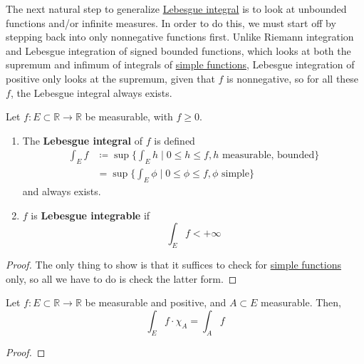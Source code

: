   The next natural step to generalize \hyperref[def:leb-int-signed]{Lebesgue integral} is to look at unbounded functions and/or infinite measures. In order to do this, we must start off by stepping back into only nonnegative functions first. Unlike Riemann integration and Lebesgue integration of signed bounded functions, which looks at both the supremum and infimum of integrals of \hyperref[def:simple-functions]{simple functions}, Lebesgue integration of positive only looks at the supremum, given that $f$ is nonnegative, so for all these $f$, the Lebesgue integral always exists. 

  \begin{definition}
    \label{def:lebesgue-integral-for-positive-functions}
    Let $f: E \subset \mathbb{R} \to \mathbb{R}$ be measurable, with $f \geq 0$. 
    \begin{enumerate}
      \item The \textbf{Lebesgue integral} of $f$ is defined 
        \begin{align}
          \int_E f & \coloneqq \sup \bigg\{ \int_E h \; \bigg| \; 0 \leq h \leq f, h \text{ measurable, bounded} \bigg\} \\ 
                   & = \sup \bigg\{ \int_E \phi \; \bigg| \; 0 \leq \phi \leq f, \phi \text{ simple} \bigg\}
        \end{align}
        and always exists. 

      \item $f$ is \textbf{Lebesgue integrable} if  
        \begin{equation}
          \int_E f < +\infty 
        \end{equation}
    \end{enumerate}
  \end{definition}
  \begin{proof}
    The only thing to show is that it suffices to check for \hyperref[def:simple-functions]{simple functions} only, so all we have to do is check the latter form. 
  \end{proof} 

  \begin{lemma}[Masking]
    \label{thm:masking-2}
    Let $f: E \subset \mathbb{R} \to \mathbb{R}$ be measurable and positive, and $A \subset E$ measurable. Then, 
    \begin{equation}
      \int_E f \cdot \chi_A = \int_A f
    \end{equation}
  \end{lemma}
  \begin{proof}
    
  \end{proof}

